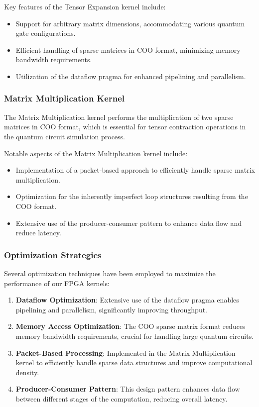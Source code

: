 \documentclass[12pt,oneside,a4paper]{article}
\begin{document}
Key features of the Tensor Expansion kernel include:

\begin{itemize}
    \item Support for arbitrary matrix dimensions, accommodating various quantum gate configurations.
    \item Efficient handling of sparse matrices in COO format, minimizing memory bandwidth requirements.
    \item Utilization of the dataflow pragma for enhanced pipelining and parallelism.
\end{itemize}

\subsubsection{Matrix Multiplication Kernel}

The Matrix Multiplication kernel performs the multiplication of two sparse matrices in COO format, which is essential for tensor contraction operations in the quantum circuit simulation process.

Notable aspects of the Matrix Multiplication kernel include:

\begin{itemize}
    \item Implementation of a packet-based approach to efficiently handle sparse matrix multiplication.
    \item Optimization for the inherently imperfect loop structures resulting from the COO format.
    \item Extensive use of the producer-consumer pattern to enhance data flow and reduce latency.
\end{itemize}

\subsubsection{Optimization Strategies}

Several optimization techniques have been employed to maximize the performance of our FPGA kernels:

\begin{enumerate}
    \item \textbf{Dataflow Optimization}: Extensive use of the dataflow pragma enables pipelining and parallelism, significantly improving throughput.
	
    \item \textbf{Memory Access Optimization}: The COO sparse matrix format reduces memory bandwidth requirements, crucial for handling large quantum circuits.
	
    \item \textbf{Packet-Based Processing}: Implemented in the Matrix Multiplication kernel to efficiently handle sparse data structures and improve computational density.
	
    \item \textbf{Producer-Consumer Pattern}: This design pattern enhances data flow between different stages of the computation, reducing overall latency.
\end{enumerate}
\end{document}
